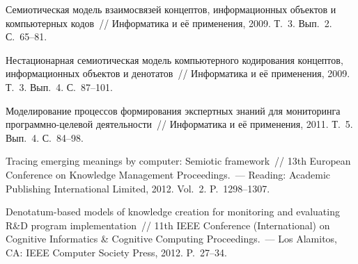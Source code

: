 \begin{multicols}{2}
{{\begin{thebibliography}{99}
 Семиотическая модель взаимосвязей концептов, информационных объектов и 
компьютерных кодов~// Информатика и её применения, 2009. Т.~3. Вып.~2. С.~65--81.

 Нестационарная семиотическая модель компьютерного кодирования концептов, 
информационных объектов и денотатов~// Информатика и её применения, 2009. Т.~3. Вып.~4. 
С.~87--101.

 Моделирование процессов формирования экспертных знаний для 
мониторинга про\-грам\-мно-це\-ле\-вой деятельности~// Информатика и её применения, 2011. Т.~5. 
Вып.~4. С.~84--98.

 Tracing emerging meanings by computer: Semiotic framework~// 13th European Conference 
on Knowledge Management Proceedings.~--- Reading: Academic Publishing International Limited, 2012. 
Vol.~2. P.~1298--1307.


 Denotatum-based models of knowledge creation for monitoring and evaluating R\&D program 
implementation~// 11th IEEE Conference (International) on Cognitive Informatics \& Cognitive Computing 
Proceedings.~--- Los Alamitos, CA: IEEE Computer Society Press, 2012. P.~27--34.



\end{thebibliography}}}
\end{multicols}
